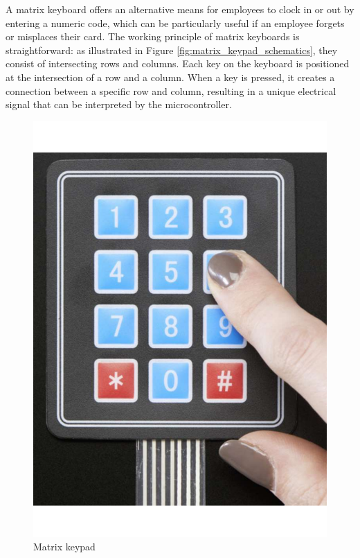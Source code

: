 A matrix keyboard offers an alternative means for employees to clock in or out by entering a numeric code, which can be 
particularly useful if an employee forgets or misplaces their card. The working principle of matrix keyboards is 
straightforward: as illustrated in Figure \ref{fig:matrix_keypad_schematics}, they consist of intersecting rows and columns. 
Each key on the keyboard is positioned at the intersection of a row and a column. When a key is pressed, it creates a 
connection between a specific row and column, resulting in a unique electrical signal that can be interpreted by the 
microcontroller.

\begin{figure}[h]
    \centering
    \begin{minipage}[b]{0.45\textwidth}
        \centering
        \includegraphics[width=.8\textwidth]{Imagenes/Vectorial/matrix_keypad.pdf}
        \caption{Matrix keypad}
        \label{fig:matrix_keypad}
    \end{minipage}
    \hfill
    \begin{minipage}[b]{0.45\textwidth}
        \centering

\end{minipage}
\end{figure}
